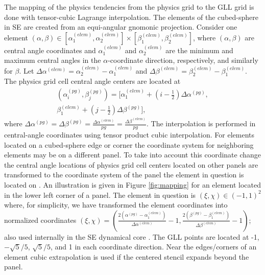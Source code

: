 \documentclass[twocol]{ametsoc}
\begin{document}
%
\appendix
The mapping of the physics tendencies from the physics grid to the GLL grid is done with tensor-cubic Lagrange interpolation. The elements of the cubed-sphere in SE are created from an equi-angular gnomonic projection. Consider one element $(\alpha,\beta) \in \left[ \alpha^{(elem)}_1,\alpha^{(elem)}_2 \right]\times \left[ \beta^{(elem)}_1,\beta^{(elem)}_2\right]$, where $(\alpha,\beta)$ are central angle coordinates and $\alpha^{(elem)}_1$ and $\alpha^{(elem)}_2$ are the minimum and maximum central angles in the $\alpha$-coordinate direction, respectively, and similarly for $\beta$. Let $\Delta \alpha^{(elem)}=\alpha^{(elem)}_2-\alpha^{(elem)}_1$ and $\Delta \beta^{(elem)}=\beta^{(elem)}_2-\beta^{(elem)}_1$. The physics grid cell central angle centers are located at
\begin{multline}
(\alpha^{(pg)}_i,\beta^{(pg)}_j)= \Big[ \alpha^{(elem)}_1+\left(i-\tfrac{1}{2}\right) \Delta \alpha^{(pg)},\\
                                      \beta^{(elem)}_1+\left(j-\tfrac{1}{2}\right) \Delta \beta^{(pg)}\Big],
\end{multline}
where $\Delta \alpha^{(pg)}=\Delta \beta^{(pg)}=\frac{\Delta \alpha^{(elem)}}{pg}=\frac{\Delta \beta^{(elem)}}{pg}$. The interpolation is performed in central-angle coordinates using tensor product cubic interpolation. For elements located on a cubed-sphere edge or corner the coordinate system for neighboring elements may be on a different panel. To take into account this coordinate change the central angle locations of physics grid cell centers located on other panels are transformed to the coordinate system of the panel the element in question is located on \cite[the transformations are given in, e.g.,  ][]{NTL2005MWRb}. An illustration is given in Figure \ref{fig:mapping} for an element located in the lower left corner of a panel. The element in question is $(\xi,\chi)\in (-1,1)^2$ where, for simplicity, we have transformed the element coordinates into normalized coordinates $(\xi,\chi) = \left( \frac{ 2\left(\alpha^{(pg)}-\alpha^{(elem)}_1\right)}{\Delta \alpha^{(elem)}}-1,\frac{2\left( \beta^{(pg)}-\beta^{(elem)}_1\right)}{\Delta \beta^{(elem)}}-1\right)$; also used internally in the SE dynamical core \citep[see, e.g., section 3.3 in ][]{LetAl2018JAMES}. The GLL points are located at -1,$-\sqrt{5}/5$, $\sqrt{5}/5$, and 1 in each coordinate direction. Near the edges/corners of an element cubic extrapolation is used if the centered stencil expands beyond the panel.
\end{document}
